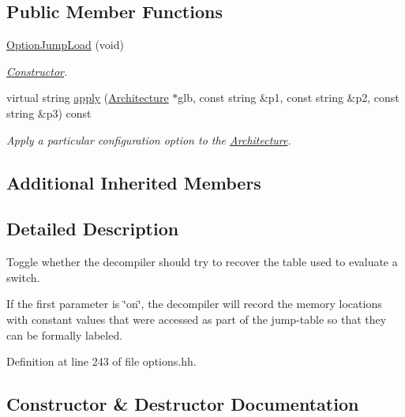 \subsection*{Public Member Functions}
\begin{DoxyCompactItemize}
\item 
\mbox{\hyperlink{class_option_jump_load_ac357c3ff664405c1c5a16ebda0793ef8}{Option\+Jump\+Load}} (void)
\begin{DoxyCompactList}\small\item\em \mbox{\hyperlink{class_constructor}{Constructor}}. \end{DoxyCompactList}\item 
virtual string \mbox{\hyperlink{class_option_jump_load_a7b290bad24d6dd14d77a04c5688300e6}{apply}} (\mbox{\hyperlink{class_architecture}{Architecture}} $\ast$glb, const string \&p1, const string \&p2, const string \&p3) const
\begin{DoxyCompactList}\small\item\em Apply a particular configuration option to the \mbox{\hyperlink{class_architecture}{Architecture}}. \end{DoxyCompactList}\end{DoxyCompactItemize}
\subsection*{Additional Inherited Members}


\subsection{Detailed Description}
Toggle whether the decompiler should try to recover the table used to evaluate a switch. 

If the first parameter is \char`\"{}on\char`\"{}, the decompiler will record the memory locations with constant values that were accessed as part of the jump-\/table so that they can be formally labeled. 

Definition at line 243 of file options.\+hh.



\subsection{Constructor \& Destructor Documentation}
\mbox{\label{class_option_jump_load_ac357c3ff664405c1c5a16ebda0793ef8}} 
